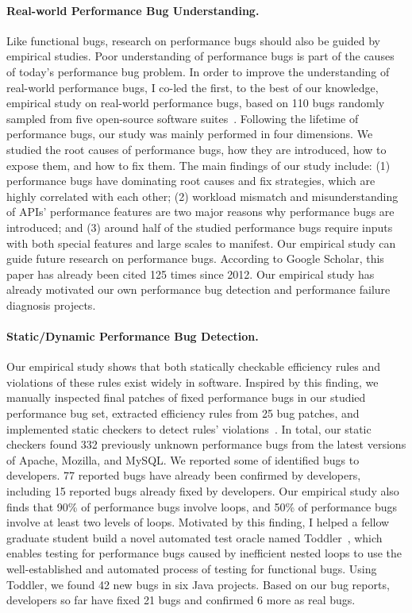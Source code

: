 \documentclass[10pt]{article}
\begin{document}
\paragraph{Real-world Performance Bug Understanding.}
Like functional bugs, research on performance bugs should also be guided by empirical studies. 
Poor understanding of performance bugs is part of the causes of today's performance bug problem. 
In order to improve the understanding of real-world performance bugs, 
I co-led the first, to the best of our knowledge, 
empirical study on real-world performance bugs, based on 110 bugs randomly sampled from five open-source software suites~\cite{jin12perfbug}. 
Following the lifetime of performance bugs, 
our study was mainly performed in four dimensions. 
We studied the root causes of performance bugs, 
how they are introduced, how to expose them, and how to fix them. 
The main findings of our study include: 
(1) performance bugs have dominating root causes and fix strategies, which are highly correlated with each other; 
(2) workload mismatch and misunderstanding of APIs' performance features are two major reasons why performance bugs are introduced; 
and (3) around half of the studied performance bugs require inputs with both special features and large scales to manifest. 
Our empirical study can guide future research on performance bugs. According to Google Scholar, this paper has already been cited 125 times since 2012. 
Our empirical study has already motivated our own performance bug detection and performance failure diagnosis projects.

\vspace{-.1in}
\paragraph{Static/Dynamic Performance Bug Detection.}
Our empirical study shows that both statically checkable efficiency rules and violations of these rules exist widely in software. 
Inspired by this finding,
we manually inspected final patches of fixed performance bugs in our studied performance bug set, 
extracted efficiency rules from 25 bug patches, 
and implemented static checkers to detect rules' violations~\cite{jin12perfbug}. 
In total, our static checkers found 332 previously unknown performance bugs from the latest versions of Apache, Mozilla, and MySQL. 
We reported some of identified bugs to developers. 
77 reported bugs have already been confirmed by developers, including 15 reported bugs already fixed by developers. 
Our empirical study also finds that 90\% of performance bugs involve loops, 
and 50\% of performance bugs involve at least two levels of loops. 
Motivated by this finding, I helped a fellow graduate student build a novel automated test oracle named Toddler~\cite{Nistor13ICSE},
which enables testing for performance bugs caused by inefficient nested loops to use the well-established and automated process of testing for functional bugs. 
Using Toddler, we found 42 new bugs in six Java projects.
Based on our bug reports, developers so far have fixed 21 bugs and confirmed 6 more as real bugs.
\end{document}
